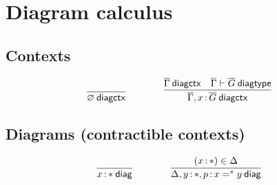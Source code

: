 

\section{Diagram calculus}

\subsection{Contexts}

\begin{small}
  \[
  \infer{\wfdiagctx{\emptyctx}}{}
  \qquad\qquad
  \infer
  {\wfdiagctx{\diag\Gamma,\tptm{x}{\diag G}}}
  {\wfdiagctx{\diag\Gamma} & \wfdiagtp{\diag\Gamma}{\diag G}}\]
\end{small}

\subsection{Diagrams (contractible contexts)}

\begin{small}
  \[
  \infer{\wfdiag{\tptm{x}{\diagbase}}}{}
  \qquad\qquad
  \infer{\wfdiag{\Delta,\tptm{y}{\diagbase},\tptm{p}{\iid{\diagbase}{x}{y}}}}
  {(\tptm{x}{\diagbase}) \in \Delta}\]
\end{small}

